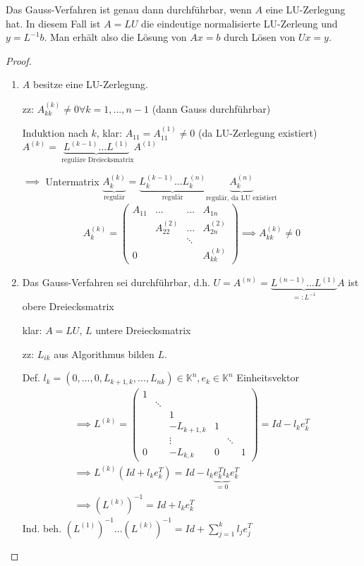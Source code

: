 \begin{theorem}
	Das Gauss-Verfahren ist genau dann durchführbar, wenn $A$ eine LU-Zerlegung hat. In diesem Fall ist $A=LU$ die eindeutige normalisierte LU-Zerleung und $y = L^{-1}b$. Man erhält also die Lösung von $Ax=b$ durch Lösen von $Ux=y$.
\end{theorem}

\begin{proof}
	\begin{enumerate}
		\item $A$ besitze eine LU-Zerlegung.
		
		zz: $A_{kk}^{(k)} \neq 0 \forall k=1, ..., n-1$ (dann Gauss durchführbar)
		
		Induktion nach $k$, klar: $A_{11} = A_{11}^{(1)} \neq 0$ (da LU-Zerlegung existiert) $A^{(k)} = \underbrace{L^{(k-1)}...L^{(1)}}_{\text{ reguläre Dreiecksmatrix}}A^{(1)}$
		
		$\implies$ Untermatrix $\underbrace{A_k^{(k)}}_{\text{regulär}} = \underbrace{L_k^{(k-1)}... L_k^{(n)}}_{\text{regulär}} \underbrace{A_k^{(n)}}_{\text{regulär, da LU existiert}}$
		\begin{align*}
			A_k^{(k)} = \left(\begin{matrix}
				A_{11} & ...          & ... & A_{1n}\\
				       & A_{22}^{(2)} & ... & A_{2n}^{(2)}\\
				       &              & \ddots\\
				0      &              &     & A_{kk}^{(k)}
			\end{matrix}\right) \implies A_{kk}^{(k)} \neq 0
		\end{align*}
		
		\item Das Gauss-Verfahren sei durchführbar, d.h. $U=A^{(n)} = \underbrace{L^{(n-1)} ... L^{(1)}}_{=: L^{-1}}A$ ist obere Dreiecksmatrix
		
		klar: $A=LU$, $L$ untere Dreiecksmatrix
		
		zz: $L_{ik}$ aus Algorithmus bilden $L$.
		
		Def. $l_k = (0, ..., 0, L_{k+1,k}, ..., L_{nk}) \in \mathbb{K}^n, e_k \in \mathbb{K}^n$ Einheitsvektor
		\begin{align*}
			\implies L^{(k)} = \left(\begin{matrix}
				1 &        &          &\\
				& \ddots &          &\\
				&        & 1        &\\
				&        &-L_{k+1,k}& 1\\
				&        & \vdots   & &  \ddots \\
				0 &        &-L_{k,k}  & 0  & & 1 
			\end{matrix}\right) = Id - l_k e_k^T\\
			\implies L^{(k)}(Id + l_ke_k^T) = Id - l_k\underbrace{e_k^Tl_k}_{=0}e_k^T\\
			\implies (L^{(k)})^{-1} = Id + l_k e_k^T
		\end{align*}
		Ind. beh. $(L^{(1)})^{-1} ... (L^{(k)})^{-1} = Id + \sum_{j=1}^{k} l_j e_j^T$
		

\end{enumerate}
\end{proof}
